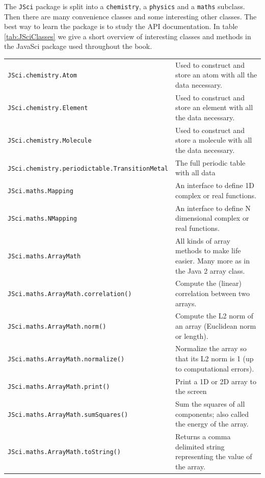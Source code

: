 The \verb|JSci| package is split into a 
\verb|chemistry|, a \verb|physics| and a \verb|maths| subclass.
Then there are many convenience classes and some interesting other classes.
The best way to learn the package is to study the API documentation. 
In table \ref{tab:JSciClasses} we give a short overview of interesting 
classes and methods in the JavaSci package used throughout the book.
\begin{table}
  \begin{center} \small
    \begin{tabular}{ll}
      \verb|JSci.chemistry.Atom| & Used to construct and store an atom 
                                   with all the data necessary.\\
      \verb|JSci.chemistry.Element| & Used to construct and store an element 
                                   with all the data necessary.\\
      \verb|JSci.chemistry.Molecule| & Used to construct and store a molecule 
                                   with all the data necessary.\\
      \verb|JSci.chemistry.periodictable.TransitionMetal| & The full periodic
         table with all data\\\hline
      \verb|JSci.maths.Mapping| & An interface to define 1D complex or real
                functions.\\
      \verb|JSci.maths.NMapping| & An interface to define N dimensional 
                complex or real functions.\\\hline
      \verb|JSci.maths.ArrayMath| & All kinds of array methods to make
                  life easier. Many more as in the Java 2 array class. \\
\verb|JSci.maths.ArrayMath.correlation()| & 
              Compute the (linear) correlation between two arrays. \\
\verb|JSci.maths.ArrayMath.norm()| & 
       Compute the L2 norm of an array (Euclidean norm or length). \\
\verb|JSci.maths.ArrayMath.normalize()| & 
   Normalize the array so that its L2 norm is 1 (up to computational errors).\\
\verb|JSci.maths.ArrayMath.print()| & Print a 1D or 2D array to the screen\\
 \verb|JSci.maths.ArrayMath.sumSquares()| & 
   Sum the squares of all components; also called the energy of the array. \\
 \verb|JSci.maths.ArrayMath.toString()| & 
  Returns a comma delimited string representing the value of the array. \\\hline

\end{tabular}
\end{center}
\end{table}
